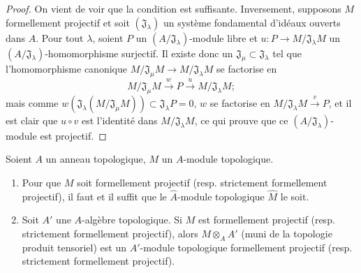 \begin{proof}
On vient de voir que la condition est suffisante. Inversement, supposons $M$
formellement projectif et soit $(\mathfrak J_\lambda)$ un système fondamental
d'idéaux ouverts dans $A$. Pour tout $\lambda$, soient $P$ un
$(A/\mathfrak J_\lambda)$-module libre et
$u:P\to M/\mathfrak J_\lambda M$ un
$(A/\mathfrak J_\lambda)$-homomorphisme surjectif. Il existe donc un
$\mathfrak J_\mu\subset\mathfrak J_\lambda$ tel que l'homomorphisme canonique
$M/\mathfrak J_\mu M\to M/\mathfrak J_\lambda M$ se factorise en
\[
  M/\mathfrak J_\mu M\xrightarrow{w}P\xrightarrow{u}M/\mathfrak J_\lambda M;
\]
mais comme
$w(\mathfrak J_\lambda(M/\mathfrak J_\mu M))\subset\mathfrak J_\lambda P=0$,
$w$ se factorise en $M/\mathfrak J_\lambda M\xrightarrow{v}P$, et il est
clair que $u\circ v$ est l'identité dans $M/\mathfrak J_\lambda M$, ce qui
prouve que ce $(A/\mathfrak J_\lambda)$-module est projectif.
\end{proof}

\begin{proposition}[19.2.5]
\label{0.19.2.5-fr}
Soient $A$ un anneau topologique, $M$ un $A$-module topologique.
\begin{enumerate}
  \item[(i)] Pour que $M$ soit formellement projectif (resp. strictement
  formellement projectif), il faut et il suffit que le $\hat A$-module
  topologique $\hat M$ le soit.
  \item[(ii)] Soit $A'$ une $A$-algèbre topologique. Si $M$ est formellement
  projectif (resp. strictement formellement projectif), alors
  $M\otimes_A A'$ (muni de la topologie produit tensoriel) est un $A'$-module
  topologique formellement projectif (resp. strictement formellement
  projectif).
\end{enumerate}
\end{proposition}

